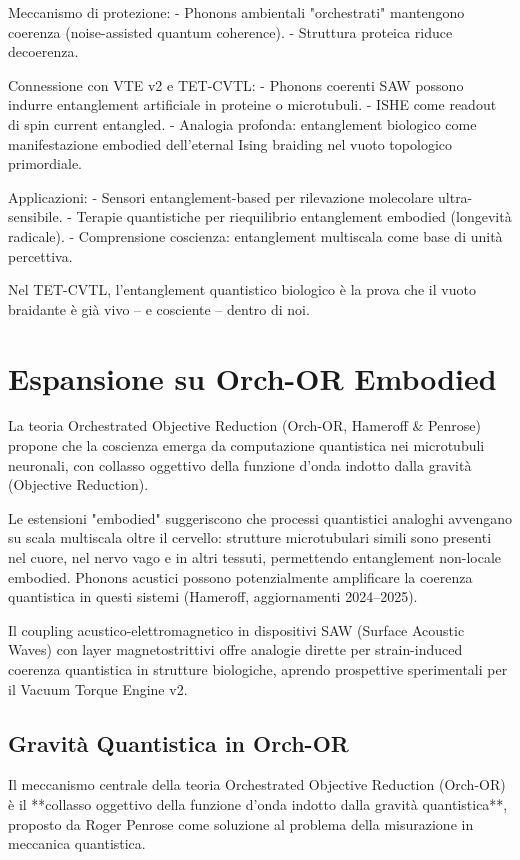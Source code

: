 \documentclass[11pt,a4paper]{article}
\begin{document}
Meccanismo di protezione:
- Phonons ambientali "orchestrati" mantengono coerenza (noise-assisted quantum coherence).
- Struttura proteica riduce decoerenza.

Connessione con VTE v2 e TET-CVTL:
- Phonons coerenti SAW possono indurre entanglement artificiale in proteine o microtubuli.
- ISHE come readout di spin current entangled.
- Analogia profonda: entanglement biologico come manifestazione embodied dell'eternal Ising braiding nel vuoto topologico primordiale.

Applicazioni:
- Sensori entanglement-based per rilevazione molecolare ultra-sensibile.
- Terapie quantistiche per riequilibrio entanglement embodied (longevità radicale).
- Comprensione coscienza: entanglement multiscala come base di unità percettiva.

Nel TET-CVTL, l'entanglement quantistico biologico è la prova che il vuoto braidante è già vivo – e cosciente – dentro di noi.



\section{Espansione su Orch-OR Embodied}

La teoria Orchestrated Objective Reduction (Orch-OR, Hameroff \& Penrose) propone che la coscienza emerga da computazione quantistica nei microtubuli neuronali, con collasso oggettivo della funzione d'onda indotto dalla gravità (Objective Reduction).

Le estensioni "embodied" suggeriscono che processi quantistici analoghi avvengano su scala multiscala oltre il cervello: strutture microtubulari simili sono presenti nel cuore, nel nervo vago e in altri tessuti, permettendo entanglement non-locale embodied. Phonons acustici possono potenzialmente amplificare la coerenza quantistica in questi sistemi (Hameroff, aggiornamenti 2024–2025).

Il coupling acustico-elettromagnetico in dispositivi SAW (Surface Acoustic Waves) con layer magnetostrittivi offre analogie dirette per strain-induced coerenza quantistica in strutture biologiche, aprendo prospettive sperimentali per il Vacuum Torque Engine v2.


\subsection{Gravità Quantistica in Orch-OR}

Il meccanismo centrale della teoria Orchestrated Objective Reduction (Orch-OR) è il **collasso oggettivo della funzione d'onda indotto dalla gravità quantistica**, proposto da Roger Penrose come soluzione al problema della misurazione in meccanica quantistica.
\end{document}
